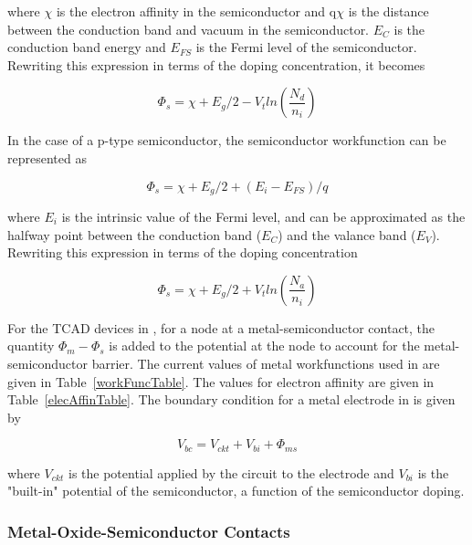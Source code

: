 where $\chi$ is the electron affinity in the semiconductor and q$\chi$ is the
distance between the conduction band and vacuum in the semiconductor.
$E_C$ is the conduction band energy and $E_{FS}$ is the Fermi level of the
semiconductor.  Rewriting this expression in terms of the doping 
concentration, it becomes

\begin{equation}
  \Phi_{s} = \chi + E_{g}/2 - V_{t}ln(\frac{N_{d}}{n_{i}})
\end{equation}

In the case of a p-type semiconductor, the semiconductor workfunction can
be represented as

\begin{equation}
  \Phi_{s} = \chi + E_{g}/2 + (E_{i}- E_{FS})/q
\end{equation}

where $E_{i}$ is the intrinsic value of the Fermi level, and can be
approximated as the halfway point between the conduction band ($E_{C}$) and the
valance band ($E_{V}$).
Rewriting this expression in terms of the doping concentration

\begin{equation}
  \Phi_{s} = \chi + E_{g}/2 + V_{t}ln(\frac{N_{a}}{n_{i}})
\end{equation}

For the TCAD devices in \Xyce{}, for a node at a metal-semiconductor
contact, the quantity $\Phi_{m} - \Phi_{s}$ is added to the potential at
the node to account for the metal-semiconductor barrier.  The current 
values of metal workfunctions used in \Xyce{} are given in
Table~\ref{workFuncTable}.  The values for electron affinity are given in
Table~\ref{elecAffinTable}.  
The boundary condition for a metal electrode in \Xyce{} is given by

\begin{equation}
 V_{bc} = V_{ckt} + V_{bi} + \Phi_{ms}
\end{equation}

where $V_{ckt}$ is the potential applied by the circuit to the electrode
and $V_{bi}$ is the "built-in" potential of the semiconductor, a
function of the semiconductor doping.

\newpage
{}
\newpage

\subsubsection{Metal-Oxide-Semiconductor Contacts}

